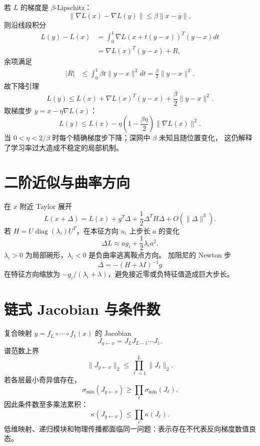 \documentclass[11pt]{article}
\numberwithin{equation}{section}
\newcommand{\1}{\mathbf{1}}
\newcommand{\diag}{\operatorname{diag}}
\begin{document}
若 $L$ 的梯度是 $\beta$-Lipschitz：
\begin{equation}
 \|\nabla L(x)-\nabla L(y)\|
 \le\beta\|x-y\|,
\end{equation}
则沿线段积分
\begin{align}
 L(y)-L(x)
 &=\int_0^1\nabla L(x+t(y-x))^T(y-x)dt\\
 &=\nabla L(x)^T(y-x)+R,
\end{align}
余项满足
\begin{align}
 |R|
 &\le\int_0^1\beta t\|y-x\|^2dt
 =\frac\beta2\|y-x\|^2.
\end{align}
故下降引理
\begin{equation}
 L(y)\le L(x)+\nabla L(x)^T(y-x)
 +\frac\beta2\|y-x\|^2.
\end{equation}
取梯度步 $y=x-\eta\nabla L(x)$：
\begin{equation}
 L(y)\le L(x)-\eta\left(1-\frac{\beta\eta}{2}\right)
 \|\nabla L(x)\|^2.
\end{equation}
当 $0<\eta<2/\beta$ 时每个精确梯度步下降；深网中 $\beta$ 未知且随位置变化，
这仍解释了学习率过大造成不稳定的局部机制。

\section{二阶近似与曲率方向}

在 $x$ 附近 Taylor 展开
\begin{equation}
 L(x+\Delta)=L(x)+g^T\Delta
 +\frac12\Delta^TH\Delta+O(\|\Delta\|^3).
\end{equation}
若 $H=U\diag(\lambda_i)U^T$，在本征方向 $u_i$ 上步长 $a$ 的变化
\begin{equation}
 \Delta L\approx a g_i+\frac12\lambda_i a^2.
\end{equation}
$\lambda_i>0$ 为局部碗形，$\lambda_i<0$ 是负曲率逃离鞍点方向。
加阻尼的 Newton 步
\begin{equation}
 \Delta=-(H+\lambda I)^{-1}g
\end{equation}
在特征方向缩放为 $-g_i/(\lambda_i+\lambda)$，避免接近零或负特征值造成巨大步长。

\section{链式 Jacobian 与条件数}

复合映射 $y=f_L\circ\cdots\circ f_1(x)$ 的 Jacobian
\begin{equation}
 J_{y\leftarrow x}=J_LJ_{L-1}\cdots J_1.
\end{equation}
谱范数上界
\begin{equation}
 \|J_{y\leftarrow x}\|_2\le\prod_{\ell=1}^{L}\|J_\ell\|_2.
\end{equation}
若各层最小奇异值存在，
\begin{equation}
 \sigma_{\min}(J_{y\leftarrow x})
 \ge\prod_\ell\sigma_{\min}(J_\ell).
\end{equation}
因此条件数至多乘法累积：
\begin{equation}
 \kappa(J_{y\leftarrow x})
 \le\prod_\ell\kappa(J_\ell).
\end{equation}
低维映射、递归模块和物理传播都面临同一问题：表示存在不代表反向梯度数值良态。
\end{document}
